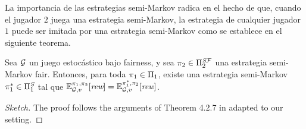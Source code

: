 La importancia de las estrategias semi-Markov radica en el hecho de que, cuando el jugador $2$ juega una estrategia semi-Markov, la estrategia de cualquier jugador $1$ puede ser imitada por una estrategia semi-Markov como se establece en el siguiente teorema.

\begin{lemma}\label{lm:semimarkov2}
  Sea $\mathcal{G}$ un juego estocástico bajo fairness,  y sea
  $\pi_{2} \in \Pi^{\textit{S}\mathcal{F}}_{2}$ una estrategia semi-Markov
  fair. Entonces, para toda $\pi_{1} \in \Pi_{1}$, existe una estrategia
  semi-Markov $\pi^*_{1} \in \Pi^{\textit{S}}_{1}$
  tal que
  $\mathbb{E}^{\pi_{1}, \pi_{2}}_{\mathcal{G}, v}[\textit{rew}] =
  \mathbb{E}^{\pi^*_{1}, \pi_{2}}_{\mathcal{G}, v}[\textit{rew}]$.
\end{lemma}
%
\iffalse
\begin{proof}[Sketch]
  The proof follows the arguments of Theorem 4.2.7 in \cite{FilarV96}
  adapted to our setting.
	

\end{proof}
